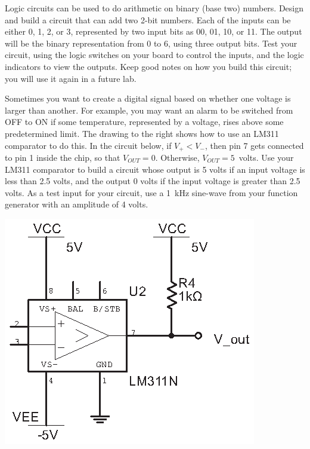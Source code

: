 \begin{enumerate}[wide]
\item Logic circuits can be used to do arithmetic on binary (base two) numbers.  Design and build a circuit that can add two 2-bit numbers.  Each of the inputs can be either 0, 1, 2, or 3, represented by two input bits as 00, 01, 10, or 11.  The output will be the binary representation from 0 to 6, using three output bits.  Test your circuit, using the logic switches on your board to control the inputs, and the logic indicators to view the outputs.  Keep good notes on how you build this circuit; you will use it again in a future lab.

\vspace{0.2in}
\begin{minipage}{.58\textwidth} %

\item Sometimes you want to create a digital signal based on whether one voltage is larger than another.  For example, you may want an alarm to be switched from OFF to ON if some temperature, represented by a voltage, rises above some predetermined limit. The drawing to the right shows how to use an LM311 comparator to do this.  In the circuit below, if $V_+<V_-$, then pin 7 gets connected to pin 1 inside the chip, so that $V_{OUT}=0$.  Otherwise, $V_{OUT}=5$~volts.  Use your LM311 comparator to build a circuit whose output is 5 volts if an input voltage is less than 2.5 volts, and the output 0 volts if the input voltage is greater than 2.5 volts.  As a test input for your circuit, use a 1~kHz sine-wave from your function generator with an amplitude of 4 volts.
\end{minipage}
\begin{minipage}{.39\textwidth}

\hspace{0.25in}\includegraphics{digital_electronics/basic_lm311.eps}
\end{minipage}


\end{enumerate}
